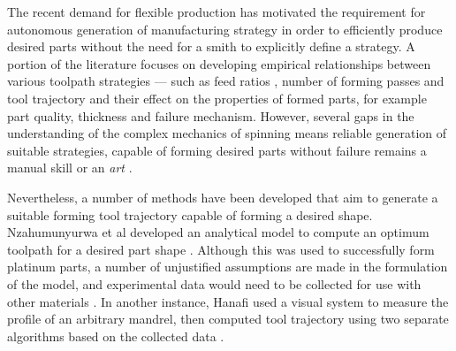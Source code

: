 The recent demand for flexible production has motivated the requirement for autonomous generation of manufacturing strategy in order to efficiently produce desired parts without the need for a smith to explicitly define a strategy. A portion of the literature focuses on developing empirical relationships between various toolpath strategies --- such as feed ratios \citep{El-Khabeery1991OnCups,Sugar2016AnalysisSteels,Wang2011EffectsCup}, number of forming passes \citep{HAYAMA1970StudySpinning} and tool trajectory \citep{Gan2016AComponents,Wang2011ASpinning,Polyblank2015ParametricSpinning} and their effect on the properties of formed parts, for example part quality, thickness and failure mechanism. 
However, several gaps in the understanding of the complex mechanics of spinning means reliable generation of suitable strategies, capable of forming desired parts without failure remains a manual skill or an \textit{art} \citep{Music2010ASpinning}.


Nevertheless, a number of methods have been developed that aim to generate a suitable forming tool trajectory capable of forming a desired shape. Nzahumunyurwa et al developed an analytical model to compute an optimum toolpath for a desired part shape \citep{Nzahumunyurwa2001OptimizationProcess}. Although this was used to successfully form platinum parts, a number of unjustified assumptions are made in the formulation of the model, and experimental data would need to be collected for use with other materials \citep{Iacopo2020CraftsmanshipSpinning}. In another instance, Hanafi used a visual system to measure the profile of an arbitrary mandrel, then computed tool trajectory using two separate algorithms based on the collected data \citep{Hanafi2003VisualSpinning}.

